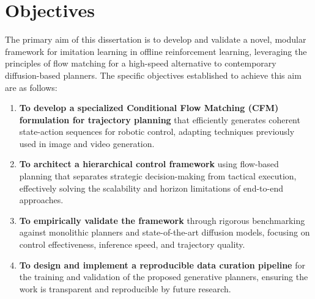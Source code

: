 \section{Objectives}
The primary aim of this dissertation is to develop and validate a novel, modular framework for imitation learning in offline reinforcement learning, leveraging the principles of flow matching for a high-speed alternative to contemporary diffusion-based planners. The specific objectives established to achieve this aim are as follows:
\begin{enumerate}
	\item \textbf{To develop a specialized Conditional Flow Matching (CFM) formulation for trajectory planning} that efficiently generates coherent state-action sequences for robotic control, adapting techniques previously used in image and video generation.
	\item \textbf{To architect a hierarchical control framework} using flow-based planning that separates strategic decision-making from tactical execution, effectively solving the scalability and horizon limitations of end-to-end approaches.
	\item \textbf{To empirically validate the framework} through rigorous benchmarking against monolithic planners and state-of-the-art diffusion models, focusing on control effectiveness, inference speed, and trajectory quality.
	\item \textbf{To design and implement a reproducible data curation pipeline} for the training and validation of the proposed generative planners, ensuring the work is transparent and reproducible by future research.
\end{enumerate}

